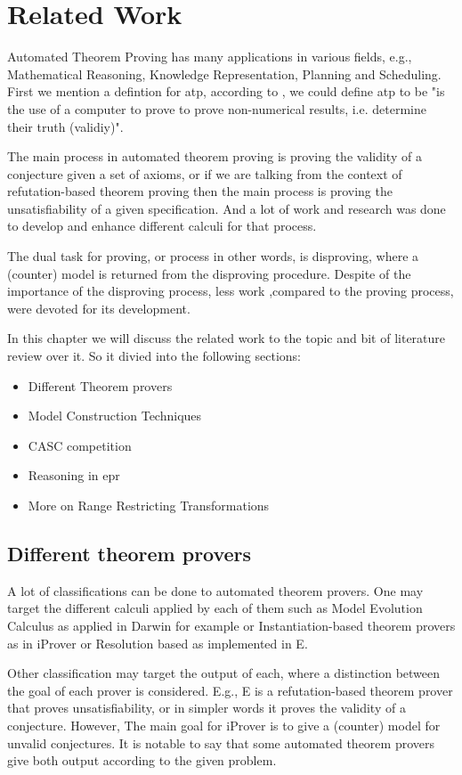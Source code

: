 \chapter{Related Work}\label{chap:rel_work}
Automated Theorem Proving has many applications in various fields, e.g., Mathematical Reasoning, Knowledge Representation, Planning and Scheduling. First we mention a defintion for \ac{atp}, according to \cite{ATP84}, we could define \ac{atp} to be "is the use of a computer to prove to prove non-numerical results, i.e. determine their truth (validiy)".  

The main process in automated theorem proving is proving the validity of a conjecture given a set of axioms, or if we are talking from the context of refutation-based theorem proving then the main process is proving the unsatisfiability of a given specification. And a lot of work and research was done to develop and enhance different calculi for that process.  


The dual task for proving, or process in other words, is disproving, where a (counter) model is returned from the disproving procedure. Despite of the importance of the disproving process, less work ,compared to the proving process, were devoted for its development.


In this chapter we will discuss the related work to the topic and bit of literature review over it. So it divied into the following sections:
	\begin{itemize}
		\item Different Theorem provers
		\item Model Construction Techniques
		\item CASC competition
		\item Reasoning in \ac{epr}
		\item More on Range Restricting Transformations
	\end{itemize}



\section{Different theorem provers}
A lot of classifications can be done to automated theorem provers. One may target the different calculi applied by each of them such as Model Evolution Calculus as applied in Darwin for example or Instantiation-based theorem provers as in iProver or Resolution based as implemented in E.


Other classification may target the output of each, where a distinction between the goal of each prover is considered. E.g., E is a refutation-based theorem prover that proves unsatisfiability, or in simpler words it proves the validity of a conjecture. However, The main goal for iProver is to give a (counter) model for unvalid conjectures. It is notable to say that some automated theorem provers give both output according to the given problem.


